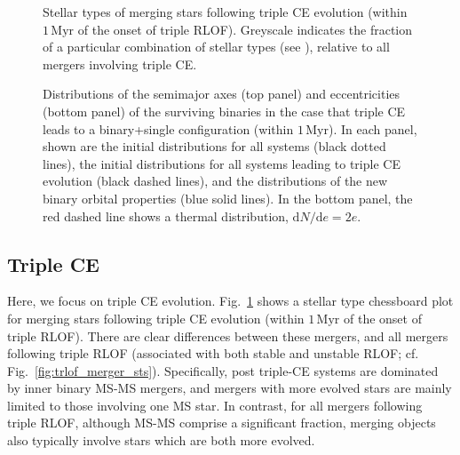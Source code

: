 \documentclass[twocolumn,appendixfloats,tighten]{aastex631}
\newcommand{\F}{Fig.}
\newcommand{\myr}{\mathrm{Myr}}
\begin{document}
\begin{figure}
\iftoggle{ApJFigs}{
\texttt{[image: TRCE\_merger\_stellar\_types]}
}{
\texttt{[image: figs/TRCE\_merger\_stellar\_types]}
}
\caption{Stellar types of merging stars following triple CE evolution (within $1\,\myr$ of the onset of triple RLOF). Greyscale indicates the fraction of a particular combination of stellar types (see \citealt{2000MNRAS.315..543H}), relative to all mergers involving triple CE. }
\label{fig:tce_merger_sts}
\end{figure}

\begin{figure}
\iftoggle{ApJFigs}{
\texttt{[image: binary\_single\_properties\_a]}
\texttt{[image: binary\_single\_properties\_e]}
}{
\texttt{[image: figs/binary\_single\_properties\_a]}
\texttt{[image: figs/binary\_single\_properties\_e]}
}
\caption{Distributions of the semimajor axes (top panel) and eccentricities (bottom panel) of the surviving binaries in the case that triple CE leads to a binary+single configuration (within $1\,\myr$). In each panel, shown are the initial distributions for all systems (black dotted lines), the initial distributions for all systems leading to triple CE evolution (black dashed lines), and the distributions of the new binary orbital properties (blue solid lines). In the bottom panel, the red dashed line shows a thermal distribution, $\mathrm{d}N/\mathrm{d} e = 2 e$.}
\label{fig:binary_single}
\end{figure}


\subsection{Triple CE}
\label{sect:popsyn:trce}
Here, we focus on triple CE evolution. \F~\ref{fig:tce_merger_sts} shows a stellar type chessboard plot for merging stars following triple CE evolution (within $1\,\myr$ of the onset of triple RLOF). There are clear differences between these mergers, and all mergers following triple RLOF (associated with both stable and unstable RLOF; cf. \F~\ref{fig:trlof_merger_sts}). Specifically, post triple-CE systems are dominated by inner binary MS-MS mergers, and mergers with more evolved stars are mainly limited to those involving one MS star. In contrast, for all mergers following triple RLOF, although MS-MS comprise a significant fraction, merging objects also typically involve stars which are both more evolved. 
\end{document}
